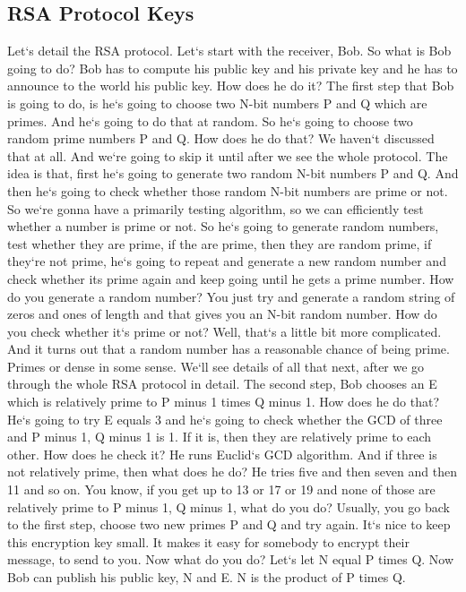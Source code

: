 \subsection{RSA Protocol  Keys}
Let`s detail the RSA protocol.
Let`s start with the receiver, Bob.
So what is Bob going to do? Bob has to compute his public key and his private key and he has to announce to the world his public key.
How does he do it? The first step that Bob is going to do, is he`s going to choose two N-bit numbers P and Q which are primes.
And he`s going to do that at random.
So he`s going to choose two random prime numbers P and Q\@.
How does he do that? We haven`t discussed that at all.
And we`re going to skip it until after we see the whole protocol.
The idea is that, first he`s going to generate two random N-bit numbers P and Q\@.
And then he`s going to check whether those random N-bit numbers are prime or not.
So we`re gonna have a primarily testing algorithm, so we can efficiently test whether a number is prime or not.
So he`s going to generate random numbers, test whether they are prime, if the are prime, then they are random prime, if they`re not prime, he`s going to repeat and generate a new random number and check whether its prime again and keep going until he gets a prime number.
How do you generate a random number? You just try and generate a random string of zeros and ones of length and that gives you an N-bit random number.
How do you check whether it`s prime or not? Well, that`s a little bit more complicated.
And it turns out that a random number has a reasonable chance of being prime.
Primes or dense in some sense.
We`ll see details of all that next, after we go through the whole RSA protocol in detail.
The second step, Bob chooses an E which is relatively prime to P minus 1 times Q minus 1.
How does he do that? He`s going to try E equals 3 and he`s going to check whether the GCD of three and P minus 1, Q minus 1 is 1.
If it is, then they are relatively prime to each other.
How does he check it? He runs Euclid`s GCD algorithm.
And if three is not relatively prime, then what does he do? He tries five and then seven and then 11 and so on.
You know, if you get up to 13 or 17 or 19 and none of those are relatively prime to P minus 1, Q minus 1, what do you do? Usually, you go back to the first step, choose two new primes P and Q and try again.
It`s nice to keep this encryption key small.
It makes it easy for somebody to encrypt their message, to send to you.
Now what do you do? Let`s let N equal P times Q\@.
Now Bob can publish his public key, N and E\@.
N is the product of P times Q\@.
